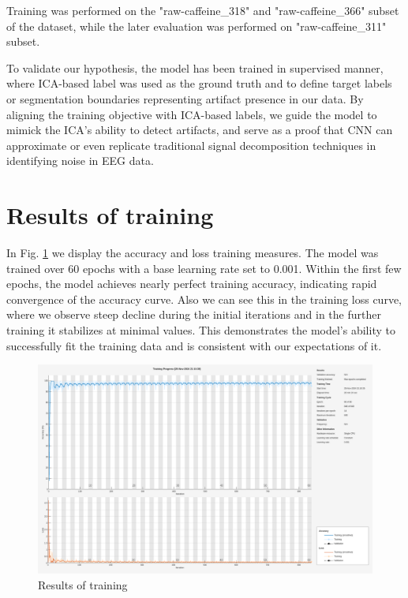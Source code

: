 \documentclass[12pt,a4paper,titlepage,openany]{report}
\begin{document}
Training was performed on the "raw-caffeine\_318" and "raw-caffeine\_366" subset of the dataset, while the later evaluation was performed on "raw-caffeine\_311" subset.

To validate our hypothesis, the model has been trained in supervised manner, where ICA-based label was used as the ground truth and to define target labels or segmentation boundaries representing artifact presence in our data. By aligning the training objective with ICA-based labels, we guide the model to mimick the ICA's ability to detect artifacts, and serve as a proof that CNN can approximate or even replicate traditional signal decomposition techniques in identifying noise in EEG data.

\section{Results of training}

In Fig. \ref{fig:training} we display the accuracy and loss training measures. The model was trained over 60 epochs with a base learning rate set to 0.001. Within the first few epochs, the model achieves nearly perfect training accuracy, indicating rapid convergence of the accuracy curve.
Also we can see this in the training loss curve, where we observe steep decline during the initial iterations and in the further training it stabilizes at minimal values.
This demonstrates the model's ability to successfully fit the training data and is consistent with our expectations of it.

\begin{figure}[H]
     \includegraphics[width=1\linewidth]{./new_training/training_chart_new.png}
     \caption{Results of training}
     \label{fig:training}
\end{figure}
\end{document}
